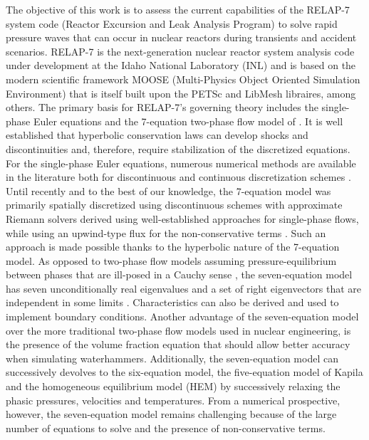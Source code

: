 \documentclass{inputs/mc2015}
\begin{document}

The objective of this work is to assess the current capabilities of the RELAP-7 system code (Reactor Excursion and Leak Analysis Program) \cite{Berry_Peterson_2014} to solve rapid pressure waves that can occur in nuclear reactors during transients and accident scenarios. RELAP-7 is the next-generation nuclear reactor system analysis code under development at the Idaho National Laboratory (INL) and is based on the modern scientific framework  MOOSE \cite{MOOSE} (Multi-Physics Object Oriented Simulation Environment) that is itself built upon the PETSc and LibMesh libraires, among others.
%
The primary basis for RELAP-7's governing theory includes the single-phase Euler equations \cite{Toro} and the 7-equation two-phase flow model of \cite{SEM, Berry_MC_2014}. It is well established that hyperbolic conservation laws can develop shocks and discontinuities \cite{Leveque} and, therefore, require stabilization of the discretized equations. For the single-phase Euler equations, numerous numerical methods are available in the literature both for discontinuous and continuous discretization schemes
\cite{Toro, Lapidus_paper, LMP, Lapidus_book, Roe, SUPG}. Until recently and to the best of our knowledge, the 7-equation model was primarily spatially discretized using discontinuous schemes with approximate 
Riemann solvers derived using well-established approaches for single-phase flows, while using an upwind-type flux for the non-conservative terms 
\cite{Saurel_2001a, Saurel_2001b, Li_2004, Zein_2010, Ambroso_2012}. Such an approach is made possible thanks to the hyperbolic nature of the 7-equation model. As opposed to two-phase flow models assuming pressure-equilibrium between phases that are ill-posed in a Cauchy sense \cite{stewart-wendroff-1984}, the seven-equation model has seven unconditionally real eigenvalues and a set of right eigenvectors that are independent in some limits \cite{coquel_herard}. Characteristics can also be derived and used to implement boundary conditions. Another advantage of the seven-equation model over the more traditional two-phase flow models used in nuclear engineering, is the presence of the volume fraction equation that should allow better accuracy when simulating waterhammers. Additionally, the seven-equation model can successively devolves to the six-equation model, the five-equation model of Kapila \cite{Kapila_2001} and the homogeneous equilibrium model (HEM) by successively relaxing the phasic pressures, velocities and temperatures. From a numerical prospective, however, the seven-equation model remains challenging because of the large number of equations to solve and the presence of non-conservative terms.
\end{document}
